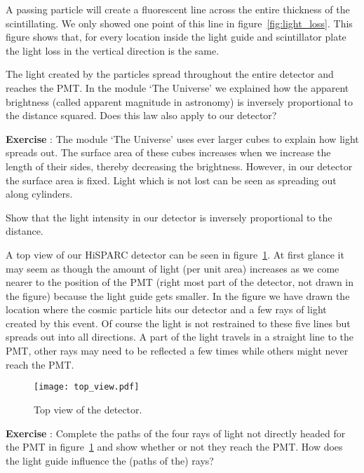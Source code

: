 A passing particle will create a fluorescent line across the entire thickness of the scintillating. We only showed one point of this line in figure~\ref{fig:light_loss}. This figure shows that, for every location inside the light guide and scintillator plate the light loss in the vertical direction is the same.

The light created by the particles spread throughout the entire detector and reaches the PMT. In the module `The Universe' we explained how the apparent brightness (called apparent magnitude in astronomy) is inversely proportional to the distance squared. Does this law also apply to our detector?

\begin{shaded}
\textbf{Exercise \theExercise {}} : The module `The Universe' uses ever larger cubes to explain how light spreads out. The surface area of these cubes increases when we increase the length of their sides, thereby decreasing the brightness. However, in our detector the surface area is fixed. Light which is not lost can be seen as spreading out along cylinders. 

Show that the light intensity in our detector is inversely proportional to the distance. \end{shaded}

A top view of our HiSPARC detector can be seen in figure~\ref{fig:top_view}. At first glance it may seem as though the amount of light (per unit area) increases as we come nearer to the position of the PMT (right most part of the detector, not drawn in the figure) because the light guide gets smaller. In the figure we have drawn the location where the cosmic particle hits our detector and a few rays of light created by this event. Of course the light is not restrained to these five lines but spreads out into all directions. A part of the light travels in a straight line to the PMT, other rays may need to be reflected a few times while others might never reach the PMT.

\begin{figure}\begin{center}
\texttt{[image: top\_view.pdf]}
\caption{Top view of the detector.}\label{fig:top_view}
\end{center}\end{figure}

\begin{shaded}
\textbf{Exercise \theExercise {}} : Complete the paths of the four rays of light not directly headed for the PMT in figure~\ref{fig:top_view} and show whether or not they reach the PMT. How does the light guide influence the (paths of the) rays? \end{shaded}

